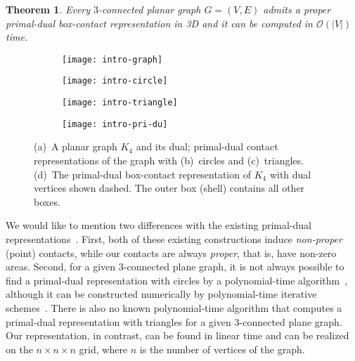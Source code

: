 \documentclass{article}
\newtheorem{theorem}{Theorem}
\newcommand{\wormhole}[1]
{
\newcounter{#1}
\setcounter{#1}{\value{theorem}}
}
\newcommand{\df}{\textit}
\newcommand{\Oh}{{\ensuremath{\mathcal{O}}}}
\begin{document}
\wormhole{thm-box}
\begin{theorem}
\label{thm:box}
Every $3$-connected planar graph $G=(V,E)$ admits a proper primal-dual box-contact
representation in 3D and it can be computed in $\Oh(|V|)$ time.
\end{theorem}

\begin{figure}[t]
\begin{subfigure}[t]{.2\textwidth}
    \centering
    \texttt{[image: intro-graph]}
    \caption{}
  \end{subfigure}
  \hfill
  \begin{subfigure}[t]{.22\textwidth}
    \centering
    \texttt{[image: intro-circle]}
    \caption{}
    \label{fig:intro2}
  \end{subfigure}
  \hfill
  \begin{subfigure}[t]{.22\textwidth}
    \centering
    \texttt{[image: intro-triangle]}
    \caption{}
  \end{subfigure}
  \hfill
  \begin{subfigure}[t]{.3\textwidth}
    \centering
    \texttt{[image: intro-pri-du]}
    \caption{}
    \label{fig:intro4}
  \end{subfigure}
    \caption{(a)~A planar graph $K_4$ and its dual; primal-dual contact representations
     of the graph with (b)~circles and (c)~triangles. (d)~The primal-dual box-contact representation of $K_4$
     with dual vertices shown dashed. The outer box (shell) contains all other boxes.}
    \label{fig:intro}
\end{figure}

We would like to mention two differences with the existing primal-dual
 representations~\cite{And70,GLP12}. First, both of these existing constructions induce \df{non-proper} (point)
 contacts, while our contacts are always \df{proper}, that is, have non-zero areas.
Second, for a given $3$-connected plane graph, it is not always possible to find a primal-dual
 representation with circles by a polynomial-time algorithm~\cite{BDEG14}, although it can be
 constructed numerically by polynomial-time iterative schemes~\cite{CS03,Moh97}.
There is also no known polynomial-time algorithm that computes a primal-dual representation
 with triangles for a given $3$-connected plane graph.
Our representation, in contrast, can be found in linear time and can be
realized on the $n\times n\times n$ grid, where $n$ is the number of vertices of the graph.
\end{document}
